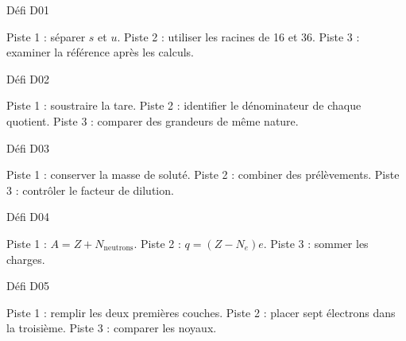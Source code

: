 \fontsize{10}{13}\selectfont
\par\addvspace{3mm}\noindent\begin{minipage}{\linewidth}
{\otSemi\color{otNavy}Défi D01}\label{indice-1}\par\vspace{1mm}
Piste 1 : séparer $s$ et $u$. Piste 2 : utiliser les racines de 16 et 36. Piste 3 : examiner la référence après les calculs.
\end{minipage}\par

\par\addvspace{3mm}\noindent\begin{minipage}{\linewidth}
{\otSemi\color{otNavy}Défi D02}\label{indice-2}\par\vspace{1mm}
Piste 1 : soustraire la tare. Piste 2 : identifier le dénominateur de chaque quotient. Piste 3 : comparer des grandeurs de même nature.
\end{minipage}\par

\par\addvspace{3mm}\noindent\begin{minipage}{\linewidth}
{\otSemi\color{otNavy}Défi D03}\label{indice-3}\par\vspace{1mm}
Piste 1 : conserver la masse de soluté. Piste 2 : combiner des prélèvements. Piste 3 : contrôler le facteur de dilution.
\end{minipage}\par

\par\addvspace{3mm}\noindent\begin{minipage}{\linewidth}
{\otSemi\color{otNavy}Défi D04}\label{indice-4}\par\vspace{1mm}
Piste 1 : $A=Z+N_{\mathrm{neutrons}}$. Piste 2 : $q=(Z-N_e)e$. Piste 3 : sommer les charges.
\end{minipage}\par

\par\addvspace{3mm}\noindent\begin{minipage}{\linewidth}
{\otSemi\color{otNavy}Défi D05}\label{indice-5}\par\vspace{1mm}
Piste 1 : remplir les deux premières couches. Piste 2 : placer sept électrons dans la troisième. Piste 3 : comparer les noyaux.
\end{minipage}\par

